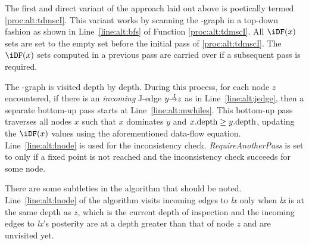 {The first and direct variant of the approach laid out above is poetically 
termed \ref{proc:alt:tdmscI}.  This variant works by scanning the \DJ-graph in 
a top-down fashion as shown in Line~\ref{line:alt:bfs} of Function 
\ref{proc:alt:tdmscI}.
All $\iDF(x)$ sets are set to the empty set before the initial pass of 
\ref{proc:alt:tdmscI}.  The $\iDF(x)$ sets computed in a previous pass are 
carried over if a subsequent pass is required.

The \DJ-graph is visited depth by depth. 
During this process, for each node $z$ encountered, if there is an \emph{incoming} J-edge $y \st{J} z$ as in Line~\ref{line:alt:jedge}, then a separate bottom-up pass starts at Line~\ref{line:alt:mwhiles}. 
This bottom-up pass traverses all nodes $x$ such that $x$ dominates $y$ and $x.\textrm{depth} \geq y.\textrm{depth}$, updating the $\iDF(x)$ values using the aforementioned data-flow equation. 
Line~\ref{line:alt:lnode} is used for the inconsistency check. 
\textit{RequireAnotherPass} is set to \true only if a fixed point is not reached and the inconsistency check succeeds for some node.

There are some subtleties in the algorithm that should be noted. 
Line~\ref{line:alt:lnode} of the algorithm visits incoming edges to \textit{lx} only when \textit{lx} is at the same depth as $z$, which is the current depth of inspection and the incoming edges to \textit{lx}'s posterity are at a depth greater than that of node $z$ and are unvisited yet.

}
